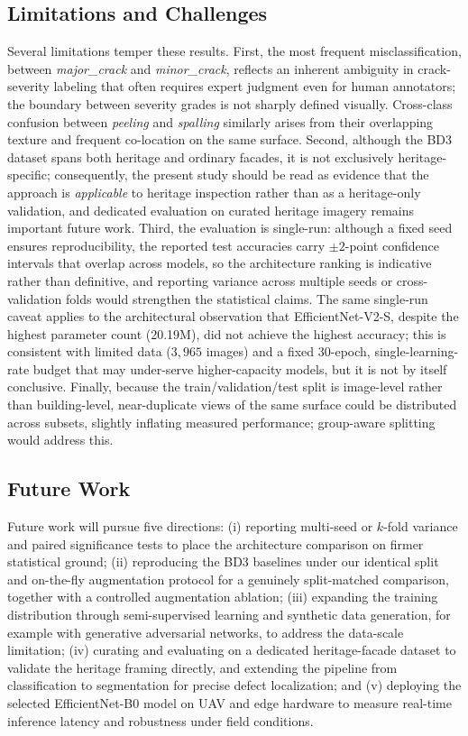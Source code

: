 \documentclass[ASNA, twocolumn]{USG}
\begin{document}
\subsection{Limitations and Challenges}
\label{sec:limitations}
Several limitations temper these results. First, the most frequent misclassification, between \textit{major\_crack} and \textit{minor\_crack}, reflects an inherent ambiguity in crack-severity labeling that often requires expert judgment even for human annotators; the boundary between severity grades is not sharply defined visually. Cross-class confusion between \textit{peeling} and \textit{spalling} similarly arises from their overlapping texture and frequent co-location on the same surface. Second, although the BD3 dataset spans both heritage and ordinary facades, it is not exclusively heritage-specific; consequently, the present study should be read as evidence that the approach is \emph{applicable} to heritage inspection rather than as a heritage-only validation, and dedicated evaluation on curated heritage imagery remains important future work. Third, the evaluation is single-run: although a fixed seed ensures reproducibility, the reported test accuracies carry $\pm2$-point confidence intervals that overlap across models, so the architecture ranking is indicative rather than definitive, and reporting variance across multiple seeds or cross-validation folds would strengthen the statistical claims. The same single-run caveat applies to the architectural observation that EfficientNet-V2-S, despite the highest parameter count (20.19M), did not achieve the highest accuracy; this is consistent with limited data ($3{,}965$ images) and a fixed 30-epoch, single-learning-rate budget that may under-serve higher-capacity models, but it is not by itself conclusive. Finally, because the train/validation/test split is image-level rather than building-level, near-duplicate views of the same surface could be distributed across subsets, slightly inflating measured performance; group-aware splitting would address this.

\subsection{Future Work}
Future work will pursue five directions: (i) reporting multi-seed or $k$-fold variance and paired significance tests to place the architecture comparison on firmer statistical ground; (ii) reproducing the BD3 baselines under our identical split and on-the-fly augmentation protocol for a genuinely split-matched comparison, together with a controlled augmentation ablation; (iii) expanding the training distribution through semi-supervised learning and synthetic data generation, for example with generative adversarial networks, to address the data-scale limitation; (iv) curating and evaluating on a dedicated heritage-facade dataset to validate the heritage framing directly, and extending the pipeline from classification to segmentation for precise defect localization; and (v) deploying the selected EfficientNet-B0 model on UAV and edge hardware to measure real-time inference latency and robustness under field conditions.
\end{document}
